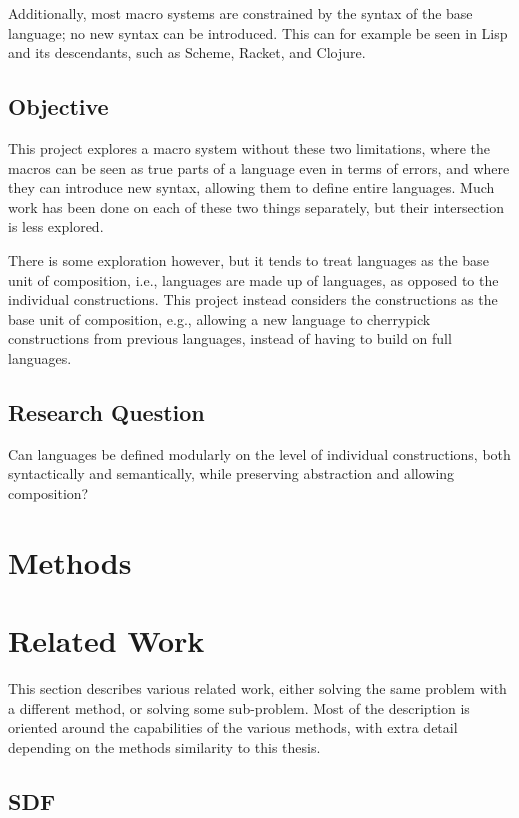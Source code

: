 \documentclass{kththesis}
\begin{document}
Additionally, most macro systems are constrained by the syntax of the base language; no new syntax can be introduced. This can for example be seen in Lisp and its descendants, such as Scheme, Racket, and Clojure.

\section{Objective}

This project explores a macro system without these two limitations, where the macros can be seen as true parts of a language even in terms of errors, and where they can introduce new syntax, allowing them to define entire languages. Much work has been done on each of these two things separately, but their intersection is less explored.

There is some exploration however, but it tends to treat languages as the base unit of composition, i.e., languages are made up of languages, as opposed to the individual constructions. This project instead considers the constructions as the base unit of composition, e.g., allowing a new language to cherrypick constructions from previous languages, instead of having to build on full languages.

\section{Research Question}

Can languages be defined modularly on the level of individual constructions, both syntactically and semantically, while preserving abstraction and allowing composition?

\chapter{Methods}

\chapter{Related Work}

This section describes various related work, either solving the same problem with a different method, or solving some sub-problem. Most of the description is oriented around the capabilities of the various methods, with extra detail depending on the methods similarity to this thesis.

\section{SDF}
\end{document}
